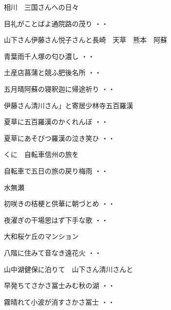相川　三国さんへの日々
\begin{shiika}目礼がことばよ通院路の茂り
\hfill{・・}\end{shiika}
\vspace{0.6cm}
山下さん伊藤さん悦子さんと長崎　天草　熊本　阿蘇
\begin{shiika}青葉雨千人塚の匂ひ濃し
\hfill{・・}\end{shiika}
\begin{shiika}土産店菖蒲と競ふ肥後名所
\hfill{・・}\end{shiika}
\begin{shiika}五月晴阿蘇の寝釈迦に帰途祈り
\hfill{・・}\end{shiika}
\vspace{0.6cm}
伊藤さん清川さん」と寄居少林寺五百羅漢
\begin{shiika}夏草に五百羅漢のかくれんぼ
\hfill{・・}\end{shiika}
\begin{shiika}夏草にあそびつ羅漢の泣き笑ひ
\hfill{・・}\end{shiika}
\vspace{0.6cm}
くに　自転車信州の旅を
\begin{shiika}自転車で五日の旅の戻り梅雨
\hfill{・・}\end{shiika}
\vspace{0.6cm}
水無瀬
\begin{shiika}初咲きの桔梗と供華に朝づとめ
\hfill{・・}\end{shiika}
\begin{shiika}夜濯ぎの干場思はず下手な歌
\hfill{・・}\end{shiika}
\vspace{0.6cm}
大和桜ケ丘のマンション
\begin{shiika}八階に住みて音なき遠花火
\hfill{・・}\end{shiika}
\vspace{0.6cm}
山中湖健保に泊りて　山下さん清川さんと
\begin{shiika}早発ちてさかさ冨士みむ秋の湖
\hfill{・・}\end{shiika}
\begin{shiika}霧晴れて小波が消すさかさ冨士
\hfill{・・}\end{shiika}

